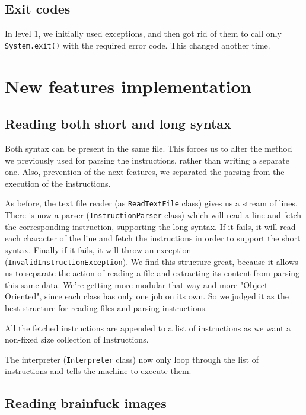 \documentclass{article}
\begin{document}
\subsection{Exit codes}

In level 1, we initially used exceptions, and then got rid of them to call only \texttt{System.exit()} with the required error code. This changed another time.

\section{New features implementation}

\subsection{Reading both short and long syntax}

Both syntax can be present in the same file. This forces us to alter the method we previously used for parsing the instructions, rather than writing a separate one. Also, prevention of the next features, we separated the parsing from the execution of the instructions.

As before, the text file reader (as \texttt{ReadTextFile} class) gives us a stream of lines. There is now a parser (\texttt{InstructionParser} class) which will read a line and fetch the corresponding instruction, supporting the long syntax. If it fails, it will read each character of the line and fetch the instructions in order to support the short syntax. Finally if it fails, it will throw an exception (\texttt{InvalidInstructionException}). We find this structure great, because it allows us to separate the action of reading a file and extracting its content from parsing this same data. We're getting more modular that way and more "Object Oriented", since each class has only one job on its own. So we judged it as the best structure for reading files and parsing instructions.

All the fetched instructions are appended to a list of instructions as we want a non-fixed size collection of Instructions.

The interpreter (\texttt{Interpreter} class) now only loop through the list of instructions and tells the machine to execute them.

\subsection{Reading brainfuck images}
\end{document}
